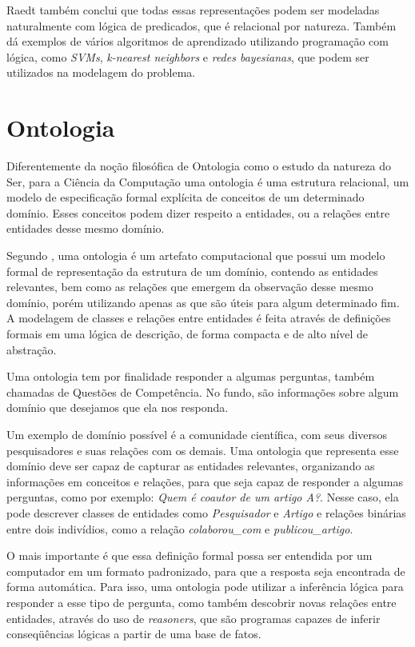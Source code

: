 Raedt também conclui que todas essas representações podem ser modeladas naturalmente com lógica de predicados, que é relacional por natureza. Também dá exemplos de vários algoritmos de aprendizado utilizando programação com lógica,
como \textit{SVMs}, \textit{k-nearest neighbors} e \textit{redes bayesianas}, que podem ser utilizados na modelagem do problema.

\section{Ontologia}
\label{sec:ontologia}

Diferentemente da noção filosófica de Ontologia como o estudo da natureza do Ser, para a Ciência da Computação uma ontologia é uma estrutura relacional, um modelo de especificação formal explícita de conceitos de um determinado domínio.
Esses conceitos podem dizer respeito a entidades, ou a relações entre entidades desse mesmo domínio.

Segundo \citet{Guarino2009}, uma ontologia é um artefato computacional que possui um modelo formal de representação da estrutura de um domínio, contendo as entidades relevantes, bem como as relações que emergem da observação desse mesmo domínio, porém utilizando apenas as que são úteis para algum determinado fim. A modelagem de classes e relações entre entidades é feita através de definições formais em uma lógica de descrição, de forma compacta e de alto nível de abstração.

Uma ontologia tem por finalidade responder a algumas perguntas, também chamadas de Questões de Competência. No fundo, são informações sobre algum domínio que desejamos que ela nos responda.

Um exemplo de domínio possível é a comunidade científica, com seus diversos pesquisadores e suas relações com os demais. Uma ontologia que representa esse domínio deve ser capaz de capturar as entidades relevantes, organizando as informações em conceitos e relações, para que seja capaz de responder a algumas perguntas, como por exemplo: \textit{Quem é coautor de um artigo A?}. Nesse caso, ela pode descrever classes de entidades como \textit{Pesquisador} e \textit{Artigo} e relações binárias entre dois indivídios, como a relação \textit{colaborou\_com} e \textit{publicou\_artigo}.

O mais importante é que essa definição formal possa ser entendida por um computador em um formato padronizado, para que a resposta seja encontrada de forma automática. Para isso, uma ontologia pode utilizar a inferência lógica para responder a esse tipo de pergunta, como também descobrir novas relações entre entidades, através do uso de \textit{reasoners}, que são programas capazes de inferir conseqüências lógicas a partir de uma base de fatos.

